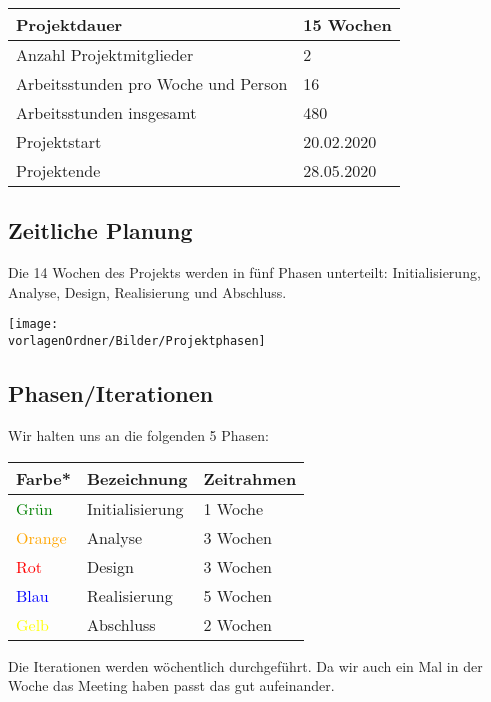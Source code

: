 \documentclass[
	ngerman,
	toc=listof, %
	toc=bibliography, %
	footnotes=multiple, %
	parskip=half, %
	numbers=noendperiod %
]{scrartcl}
\newcommand{\vorlagenOrdner}{../../99_Vorlagen} %
\begin{document}
		\begin{tabularx}{\textwidth}{Xl}
			\midrule
			Projektdauer & 15 Wochen \\
			\midrule
			Anzahl Projektmitglieder & 2 \\
			\midrule
			Arbeitsstunden pro Woche und Person & 16 \\
			\midrule
			Arbeitsstunden insgesamt & 480 \\
			\midrule
			Projektstart & 20.02.2020 \\
			\midrule
			Projektende & 28.05.2020 \\
			\midrule
		\end{tabularx}

	\subsection{Zeitliche Planung}
		Die 14 Wochen des Projekts werden in fünf Phasen unterteilt: Initialisierung, Analyse, Design, Realisierung und Abschluss.
		\begin{center}
			\label{ZeitplanOverview}
			\texttt{[image: \\vorlagenOrdner/Bilder/Projektphasen]}
		\end{center}

	\subsection{Phasen/Iterationen}
		Wir halten uns an die folgenden 5 Phasen: \\
		\begin{tabularx}{\textwidth}{lll}
			\toprule
			Farbe* & Bezeichnung & Zeitrahmen \\
			\midrule
			\textcolor{green}{Grün} & Initialisierung & 1 Woche \\
			\textcolor{orange}{Orange} & Analyse & 3 Wochen \\
			\textcolor{red}{Rot} & Design & 3 Wochen \\
			\textcolor{blue}{Blau} & Realisierung & 5 Wochen \\
			\textcolor{yellow}{Gelb} & Abschluss & 2 Wochen \\
			\bottomrule
		\end{tabularx}
	
		Die Iterationen werden wöchentlich durchgeführt.
		Da wir auch ein Mal in der Woche das Meeting haben passt das gut aufeinander.
\end{document}
